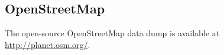 

\subsection{OpenStreetMap}

The open-source OpenStreetMap data dump is available at 
\url{http://planet.osm.org/}. 
%
